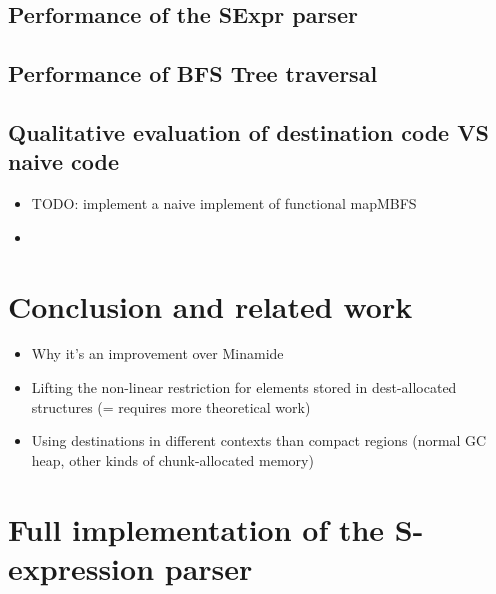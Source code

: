 \documentclass[english]{jflart}
\begin{document}

\subsection{Performance of the SExpr parser}

\subsection{Performance of BFS Tree traversal}\label{ssec:benchmark-parser}

\subsection{Qualitative evaluation of destination code VS naive code}

\begin{itemize}
\item TODO: implement a naive implement of functional mapMBFS
\item \end{itemize}

\section{Conclusion and related work}
\begin{itemize}
\item Why it's an improvement over Minamide

\item Lifting the non-linear restriction for elements stored in dest-allocated structures (= requires more theoretical work)

\item Using destinations in different contexts than compact regions (normal GC heap, other kinds of chunk-allocated memory)
\end{itemize}

\appendix

\section{Full implementation of the S-expression parser}\label{ann:parse-s-expr}
\end{document}
